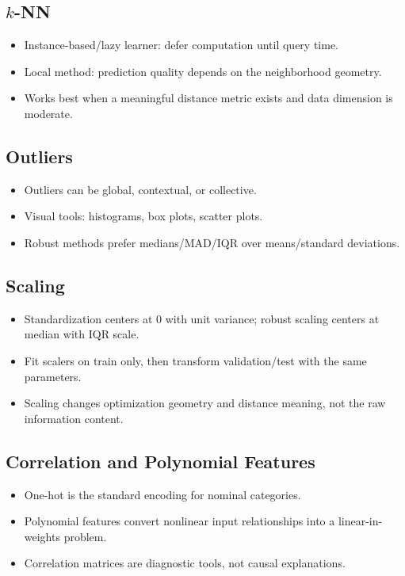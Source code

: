 \documentclass[10pt,twocolumn]{article}
\begin{document}
\subsection{$k$-NN}
\begin{itemize}
  \item Instance-based/lazy learner: defer computation until query time.
  \item Local method: prediction quality depends on the neighborhood geometry.
  \item Works best when a meaningful distance metric exists and data dimension is moderate.
\end{itemize}

\subsection{Outliers}
\begin{itemize}
  \item Outliers can be global, contextual, or collective.
  \item Visual tools: histograms, box plots, scatter plots.
  \item Robust methods prefer medians/MAD/IQR over means/standard deviations.
\end{itemize}

\subsection{Scaling}
\begin{itemize}
  \item Standardization centers at 0 with unit variance; robust scaling centers at median with IQR scale.
  \item Fit scalers on train only, then transform validation/test with the same parameters.
  \item Scaling changes optimization geometry and distance meaning, not the raw information content.
\end{itemize}

\subsection{Correlation and Polynomial Features}
\begin{itemize}
  \item One-hot is the standard encoding for nominal categories.
  \item Polynomial features convert nonlinear input relationships into a linear-in-weights problem.
  \item Correlation matrices are diagnostic tools, not causal explanations.
\end{itemize}
\end{document}
